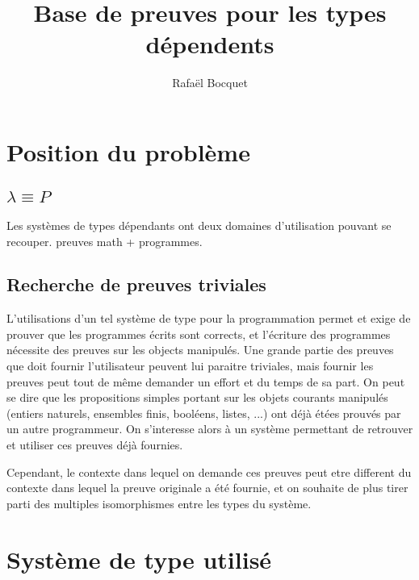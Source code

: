 \documentclass[12pt, a4paper]{article}
\title{Base de preuves pour les types dépendents}
\author{Rafaël Bocquet}
\date{}
\begin{document}
\maketitle
\tableofcontents

\newpage


\section{Position du problème}
\subsection{$\lambda \equiv P$}
Les systèmes de types dépendants ont deux domaines d'utilisation pouvant se recouper. preuves math + programmes.
\subsection{Recherche de preuves triviales}
L'utilisations d'un tel système de type pour la programmation permet et exige de prouver que les programmes écrits sont corrects, et l'écriture des programmes nécessite des preuves sur les objects manipulés. Une grande partie des preuves que doit fournir l'utilisateur peuvent lui paraitre triviales, mais fournir les preuves peut tout de même demander un effort et du temps de sa part. On peut se dire que les propositions simples portant sur les objets courants manipulés (entiers naturels, ensembles finis, booléens, listes, ...) ont déjà étées prouvés par un autre programmeur. On s'interesse alors à un système permettant de retrouver et utiliser ces preuves déjà fournies.

Cependant, le contexte dans lequel on demande ces preuves peut etre different du contexte dans lequel la preuve originale a été fournie, et on souhaite de plus tirer parti des multiples isomorphismes entre les types du système.
\section{Système de type utilisé}
\end{document}
